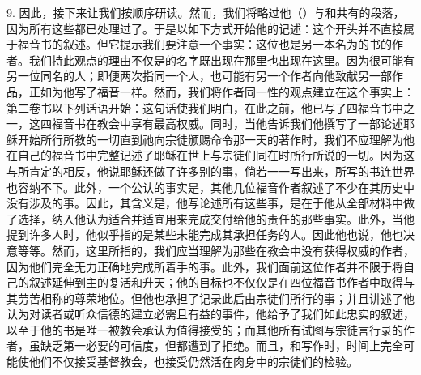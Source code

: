 9. 因此，接下来让我们按顺序研读。然而，我们将略过他（）与和共有的段落，因为所有这些都已处理过了。于是以如下方式开始他的记述：这个开头并不直接属于福音书的叙述。但它提示我们要注意一个事实：这位也是另一本名为的书的作者。我们持此观点的理由不仅是的名字既出现在那里也出现在这里。因为很可能有另一位同名的人；即便两次指同一个人，也可能有另一个作者向他致献另一部作品，正如为他写了福音一样。然而，我们将作者同一性的观点建立在这个事实上：第二卷书以下列话语开始：这句话使我们明白，在此之前，他已写了四福音书中之一，这四福音书在教会中享有最高权威。同时，当他告诉我们他撰写了一部论述耶稣开始所行所教的一切直到祂向宗徒颁赐命令那一天的著作时，我们不应理解为他在自己的福音书中完整记述了耶稣在世上与宗徒们同在时所行所说的一切。因为这与所肯定的相反，他说耶稣还做了许多别的事，倘若一一写出来，所写的书连世界也容纳不下。此外，一个公认的事实是，其他几位福音作者叙述了不少在其历史中没有涉及的事。因此，其含义是，他写论述所有这些事，是在于他从全部材料中做了选择，纳入他认为适合并适宜用来完成交付给他的责任的那些事实。此外，当他提到许多人时，他似乎指的是某些未能完成其承担任务的人。因此他也说，他也决意等等。然而，这里所指的，我们应当理解为那些在教会中没有获得权威的作者，因为他们完全无力正确地完成所着手的事。此外，我们面前这位作者并不限于将自己的叙述延伸到主的复活和升天；他的目标也不仅仅是在四位福音书作者中取得与其劳苦相称的尊荣地位。但他也承担了记录此后由宗徒们所行的事；并且讲述了他认为对读者或听众信德的建立必需且有益的事件，他给予了我们如此忠实的叙述，以至于他的书是唯一被教会承认为值得接受的；而其他所有试图写宗徒言行录的作者，虽缺乏第一必要的可信度，但都遭到了拒绝。而且，和写作时，时间上完全可能使他们不仅接受基督教会，也接受仍然活在肉身中的宗徒们的检验。\par


